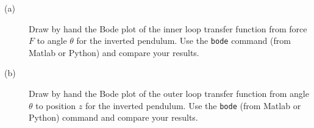 
\begin{description}
\item[(a)] Draw by hand the Bode plot of the inner loop transfer function from force $F$ to angle $\theta$ for the inverted pendulum.
Use the \texttt{bode} command (from Matlab or Python) and compare your results.
\item[(b)] Draw by hand the Bode plot of the outer loop transfer function from angle $\theta$ to position $z$ for the inverted pendulum.
Use the \texttt{bode} (from Matlab or Python) command and compare your results.
\end{description}